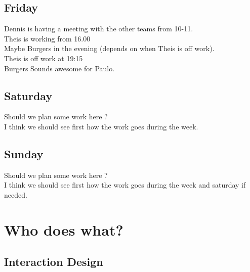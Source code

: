 \documentclass[10pt,a4paper]{article}
\begin{document}
\subsection{Friday}
Dennis is having a meeting with the other teams from 10-11.
\\ Theis is working from 16.00
\\ Maybe Burgers in the evening (depends on when Theis is off work).
\\ Theis is off work at 19:15
\\ Burgers Sounds awesome for Paulo.
\subsection{Saturday}
Should we plan some work here ?\\
I think we should see first how the work goes during the week.\\
\subsection{Sunday}
Should we plan some work here ?\\
I think we should see first how the work goes during the week and saturday if needed.\\


\newpage
\section{Who does what?}
\subsection{Interaction Design}
\end{document}

